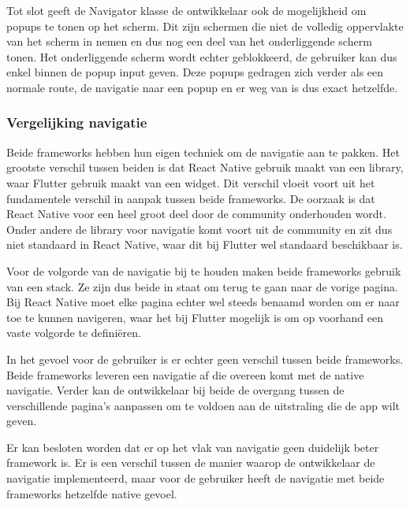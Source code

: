 Tot slot geeft de Navigator klasse de ontwikkelaar ook de mogelijkheid om popups te tonen op het scherm. Dit zijn schermen die niet de volledig oppervlakte van het scherm in nemen en dus nog een deel van het onderliggende scherm tonen. Het onderliggende scherm wordt echter geblokkeerd, de gebruiker kan dus enkel binnen de popup input geven. Deze popups gedragen zich verder als een normale route, de navigatie naar een popup en er weg van is dus exact hetzelfde.

\subsubsection{Vergelijking navigatie}
\label{subsubsec:vglNavigatie}

Beide frameworks hebben hun eigen techniek om de navigatie aan te pakken. Het grootste verschil tussen beiden is dat React Native gebruik maakt van een library, waar Flutter gebruik maakt van een widget. Dit verschil vloeit voort uit het fundamentele verschil in aanpak tussen beide frameworks. De oorzaak is dat React Native voor een heel groot deel door de community onderhouden wordt. Onder andere de library voor navigatie komt voort uit de community en zit dus niet standaard in React Native, waar dit bij Flutter wel standaard beschikbaar is.

Voor de volgorde van de navigatie bij te houden maken beide frameworks gebruik van een stack. Ze zijn dus beide in staat om terug te gaan naar de vorige pagina. Bij React Native moet elke pagina echter wel steeds benaamd worden om er naar toe te kunnen navigeren, waar het bij Flutter mogelijk is om op voorhand een vaste volgorde te definiëren.

In het gevoel voor de gebruiker is er echter geen verschil tussen beide frameworks. Beide frameworks leveren een navigatie af die overeen komt met de native navigatie. Verder kan de ontwikkelaar bij beide de overgang tussen de verschillende pagina's aanpassen om te voldoen aan de uitstraling die de app wilt geven. 

Er kan besloten worden dat er op het vlak van navigatie geen duidelijk beter framework is. Er is een verschil tussen de manier waarop de ontwikkelaar de navigatie implementeerd, maar voor de gebruiker heeft de navigatie met beide frameworks hetzelfde native gevoel.



